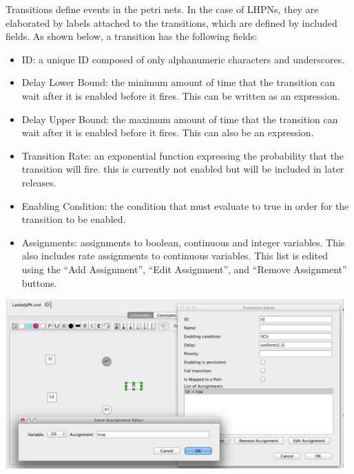 \documentclass[titlepage,11pt]{article}
\begin{document}
\noindent
Transitions define events in the petri nets.  In the case of LHPNs, they are 
elaborated by labels attached to the transitions, which are defined by included
fields.
As shown below, a transition has the following fields:
\begin{itemize}
\item ID: a unique ID composed of only alphanumeric characters and 
       underscores.
\item Delay Lower Bound: the minimum amount of time that the transition can wait
       after it is enabled before it fires.  This can be written as an 
       expression.
\item Delay Upper Bound: the maximum amount of time that the transition can wait
       after it is enabled before it fires.  This can also be an expression.
\item Transition Rate: an exponential function expressing the probability that
       the transition will fire.  this is currently not enabled but will be
       included in later releases.
\item Enabling Condition: the condition that must evaluate to true in order for
       the transition to be enabled.
\item Assignments: assignments to boolean, continuous and integer variables.
       This also includes rate assignments to continuous variables. This list
       is edited using the ``Add Assignment'', ``Edit Assignment'', and
       ``Remove Assignment'' buttons.
\end{itemize}
\begin{center}
\includegraphics[height=65mm]{screenshots/transition}
\end{center}
\end{document}
